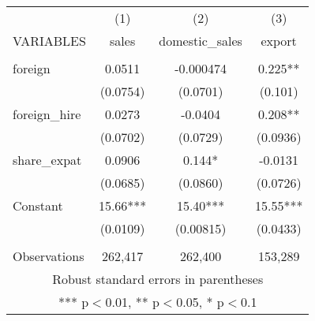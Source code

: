 \documentclass[]{article}
\begin{document}
\begin{tabular}{lccc} \hline
 & (1) & (2) & (3) \\
VARIABLES & sales & domestic\_sales & export \\ \hline
 &  &  &  \\
foreign & 0.0511 & -0.000474 & 0.225** \\
 & (0.0754) & (0.0701) & (0.101) \\
foreign\_hire & 0.0273 & -0.0404 & 0.208** \\
 & (0.0702) & (0.0729) & (0.0936) \\
share\_expat & 0.0906 & 0.144* & -0.0131 \\
 & (0.0685) & (0.0860) & (0.0726) \\
Constant & 15.66*** & 15.40*** & 15.55*** \\
 & (0.0109) & (0.00815) & (0.0433) \\
 &  &  &  \\
 Observations & 262,417 & 262,400 & 153,289 \\ \hline
\multicolumn{4}{c}{ Robust standard errors in parentheses} \\
\multicolumn{4}{c}{ *** p$<$0.01, ** p$<$0.05, * p$<$0.1} \\
\end{tabular}
\end{document}
